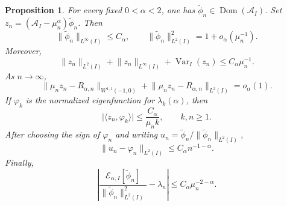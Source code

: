 \documentclass[11pt]{amsart}
\numberwithin{equation}{section}
\newtheorem{proposition}[proposition]{Proposition}
\theoremstyle{remark}
\newcommand{\wt}{\widetilde}
\newcommand{\norm}[2][]{\lVert #2\rVert_{#1}}
\newcommand{\abs}[1]{\lvert #1\rvert}
\newcommand{\ip}[2]{\langle #1,#2\rangle}
\newcommand{\Dom}{\operatorname{Dom}}
\newcommand{\Var}{\operatorname{Var}}
\newcommand{\calE}{\mathcal E}
\begin{document}
\begin{proposition}
\label{prop:qmode}
For every fixed $0<\alpha<2$, one has
$\wt\phi_n\in\Dom(\mathcal A_I)$.  Set
$z_n=(\mathcal A_I-\mu_n^\alpha)\wt\phi_n$.  Then
\begin{equation}\label{eq:qnorm-sharp}
 \norm[L^\infty(I)]{\wt\phi_n}\le C_\alpha,
 \qquad
 \norm[L^2(I)]{\wt\phi_n}^2=1+o_\alpha(\mu_n^{-1}).
\end{equation}
Moreover,
\begin{equation}\label{eq:zBV}
 \norm[L^2(I)]{z_n}+\norm[L^\infty(I)]{z_n}+\Var_I(z_n)
 \le C_\alpha\mu_n^{-1}.
\end{equation}
As $n\to\infty$,
\begin{equation}\label{eq:zlimit}
 \norm[W^{1,1}(-1,0)]{\mu_nz_n-R_{\alpha,n}}
 +\norm[L^2(I)]{\mu_nz_n-R_{\alpha,n}}
 =o_\alpha(1).
\end{equation}
If $\varphi_k$ is the normalized eigenfunction for
$\lambda_k(\alpha)$, then
\begin{equation}\label{eq:zk}
 \abs{\ip{z_n}{\varphi_k}}\le\frac{C_\alpha}{\mu_n k},
 \qquad k,n\ge1.
\end{equation}
After choosing the sign of $\varphi_n$ and writing
$u_n=\wt\phi_n/\norm[L^2(I)]{\wt\phi_n}$,
\begin{equation}\label{eq:qmode-L2close}
 \norm[L^2(I)]{u_n-\varphi_n}\le C_\alpha n^{-1-\alpha}.
\end{equation}
Finally,
\begin{equation}\label{eq:ordinary-transfer}
 \left|\frac{\calE_{\alpha,I}[\wt\phi_n]}
 {\norm[L^2(I)]{\wt\phi_n}^2}-\lambda_n\right|
 \le C_\alpha\mu_n^{-2-\alpha}.
\end{equation}
\end{proposition}
\end{document}
